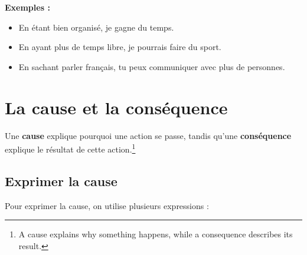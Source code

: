 \documentclass[math,code]{amznotes}
\theoremstyle{remark}
\begin{document}
\textbf{Exemples :}
\begin{itemize}
    \item En étant bien organisé, je gagne du temps.
    \item En ayant plus de temps libre, je pourrais faire du sport.
    \item En sachant parler français, tu peux communiquer avec plus de personnes.
\end{itemize}


\section{La cause et la conséquence}

Une \textbf{cause} explique pourquoi une action se passe, tandis qu'une \textbf{conséquence} explique le résultat de cette action.\footnote{A cause explains why something happens, while a consequence describes its result.}

\subsection*{Exprimer la cause}

Pour exprimer la cause, on utilise plusieurs expressions :
\end{document}
